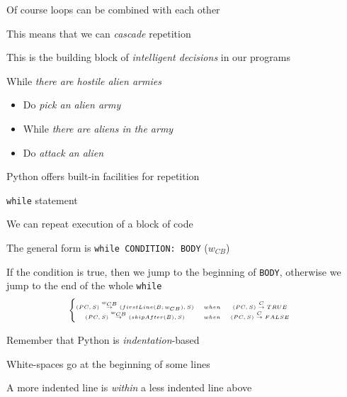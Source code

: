 \documentclass{beamer}
\begin{document}
\begin{slide}{
\item Of course loops can be combined with each other
\item This means that we can \textit{cascade} repetition
\item This is the building block of \textit{intelligent decisions} in our programs
}\end{slide}

\begin{slide}{
\item While \textit{there are hostile alien armies}
\begin{itemize}
\item Do \textit{pick an alien army}
\item While \textit{there are aliens in the army}
\item Do \textit{attack an alien}
\end{itemize}
}\end{slide}

\begin{slide}{
\item Python offers built-in facilities for repetition
\item \texttt{while} statement
\item We can repeat execution of a block of code
}\end{slide}

\begin{slide}{
\item The general form is \texttt{while CONDITION: BODY} ($w_{CB}$)
\item If the condition is true, then we jump to the beginning of \texttt{BODY}, otherwise we jump to the end of the whole \texttt{while}
$$
\tiny
\left\{
\begin{matrix}
(PC,S) \overset{w_{CB}}{\rightarrow} (firstLine(B; w_{CB}),S) &when& (PC,S) \overset{C}{\rightarrow} TRUE & \\
(PC,S) \overset{w_{CB}}{\rightarrow} (skipAfter(B),S) &when& (PC,S) \overset{C}{\rightarrow} FALSE & \\
\end{matrix}
\right.
$$
}\end{slide}

\begin{slide}{
\item Remember that Python is \textit{indentation}-based
\item White-spaces go at the beginning of some lines
\item A more indented line is \textit{within} a less indented line above
}\end{slide}
\end{document}
